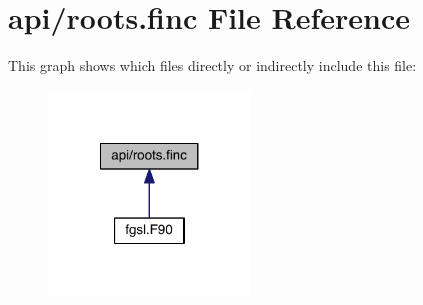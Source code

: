 \hypertarget{roots_8finc}{\section{api/roots.finc File Reference}
\label{roots_8finc}
}
This graph shows which files directly or indirectly include this file\-:\nopagebreak
\begin{figure}[H]
\begin{center}
\leavevmode
\includegraphics[width=152pt]{roots_8finc__dep__incl}
\end{center}
\end{figure}
